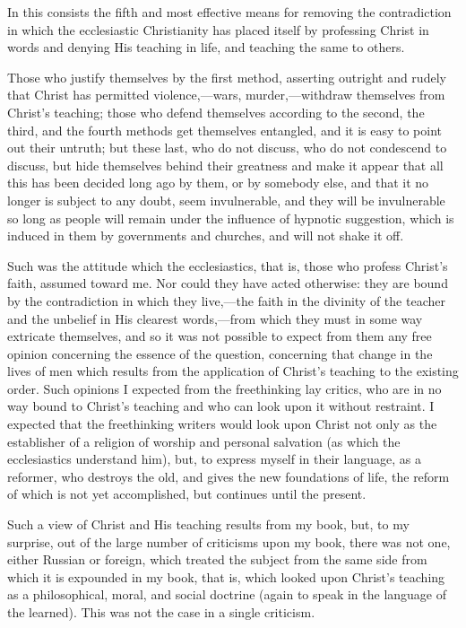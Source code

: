 \documentclass{book}
\begin{document}
In this consists the fifth and most effective means for removing the contradiction in which the ecclesiastic Christianity has placed itself by professing Christ in words and denying His teaching in life, and teaching the same to others.

Those who justify themselves by the first method, asserting outright and rudely that Christ has permitted violence,—wars, murder,—withdraw themselves from Christ’s teaching; those who defend themselves according to the second, the third, and the fourth methods get themselves entangled, and it is easy to point out their untruth; but these last, who do not discuss, who do not condescend to discuss, but hide themselves behind their greatness and make it appear that all this has been decided long ago by them, or by somebody else, and that it no longer is subject to any doubt, seem invulnerable, and they will be invulnerable so long as people will remain under the influence of hypnotic suggestion, which is induced in them by governments and churches, and will not shake it off.

Such was the attitude which the ecclesiastics, that is, those who profess Christ’s faith, assumed toward me. Nor could they have acted otherwise: they are bound by the contradiction in which they live,—the faith in the divinity of the teacher and the unbelief in His clearest words,—from which they must in some way extricate themselves, and so it was not possible to expect from them any free opinion concerning the essence of the question, concerning that change in the lives of men which results from the application of Christ’s teaching to the existing order. Such opinions I expected from the freethinking lay critics, who are in no way bound to Christ’s teaching and who can look upon it without restraint. I expected that the freethinking writers would look upon Christ not only as the establisher of a religion of worship and personal salvation (as which the ecclesiastics understand him), but, to express myself in their language, as a reformer, who destroys the old, and gives the new foundations of life, the reform of which is not yet accomplished, but continues until the present.

Such a view of Christ and His teaching results from my book, but, to my surprise, out of the large number of criticisms upon my book, there was not one, either Russian or foreign, which treated the subject from the same side from which it is expounded in my book, that is, which looked upon Christ’s teaching as a philosophical, moral, and social doctrine (again to speak in the language of the learned). This was not the case in a single criticism.
\end{document}
